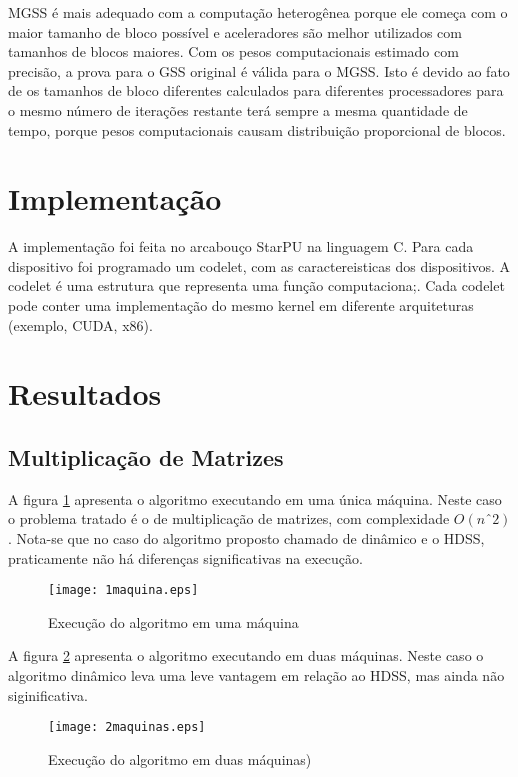 MGSS é mais adequado com a computação heterogênea porque ele começa com o maior tamanho de bloco possível e aceleradores são melhor utilizados com tamanhos de blocos maiores. Com os pesos computacionais estimado com precisão, a prova para o GSS original é válida para o MGSS. Isto é devido ao fato de os tamanhos de bloco diferentes calculados para diferentes processadores para o mesmo número de iterações restante terá sempre a mesma quantidade de tempo, porque pesos computacionais causam distribuição proporcional de blocos. 

\section{Implementação}
A implementação foi feita no arcabouço StarPU na linguagem C. Para cada dispositivo foi programado um codelet, com as caractereisticas dos dispositivos. A codelet é uma estrutura que representa uma função computaciona;. Cada codelet pode conter uma implementação do mesmo kernel em diferente arquiteturas (exemplo, CUDA, x86). 

\section{Resultados}

\subsection{Multiplicação de Matrizes}

A figura \ref{fig:1maquina} apresenta o algoritmo executando em uma única máquina. Neste caso o problema tratado é o de multiplicação de matrizes, com complexidade  $O(nˆ2)$. Nota-se que no caso do algoritmo proposto chamado de dinâmico e o HDSS, praticamente não há diferenças significativas na execução.

\begin{figure}[htb]
	\begin{center}
	\centering
			\texttt{[image: 1maquina.eps]}
	\caption{Execução do algoritmo em uma máquina}
	\label{fig:1maquina}
	\end{center}
\end{figure}

A figura \ref{fig:2maquina} apresenta o algoritmo executando em duas máquinas.  Neste caso o algoritmo dinâmico leva uma leve vantagem em relação ao HDSS, mas ainda não siginificativa.

\begin{figure}[htb]
	\begin{center}
	\centering
			\texttt{[image: 2maquinas.eps]}
	\caption{Execução do algoritmo em duas máquinas)}
	\label{fig:2maquina}
	\end{center}
\end{figure}


